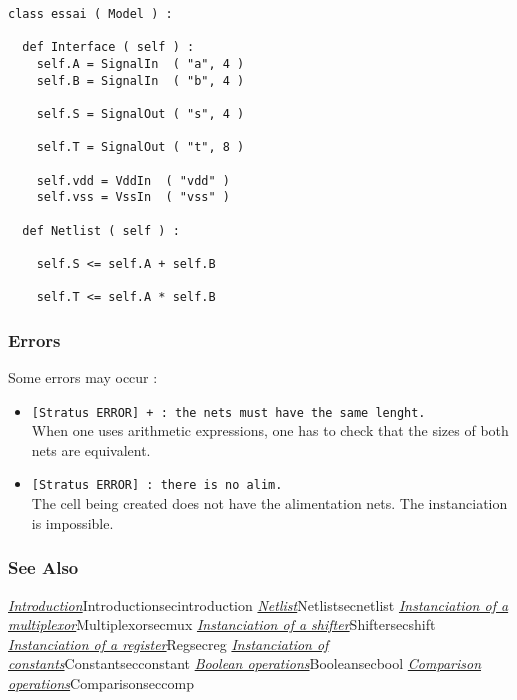 \begin{verbatim}
class essai ( Model ) :

  def Interface ( self ) :
    self.A = SignalIn  ( "a", 4 )
    self.B = SignalIn  ( "b", 4 )
    
    self.S = SignalOut ( "s", 4 )
    
    self.T = SignalOut ( "t", 8 )

    self.vdd = VddIn  ( "vdd" )
    self.vss = VssIn  ( "vss" )
	
  def Netlist ( self ) :

    self.S <= self.A + self.B

    self.T <= self.A * self.B
\end{verbatim}
    
\subsubsection{Errors}
    
Some errors may occur :
\begin{itemize}
    \item \verb-[Stratus ERROR] + : the nets must have the same lenght.-\\When one uses arithmetic expressions, one has to check that the sizes of both nets are equivalent.
    \item \verb-[Stratus ERROR] : there is no alim.-\\The cell being created does not have the alimentation nets. The instanciation is impossible.
\end{itemize}

\begin{htmlonly}

\subsubsection{See Also}

\hyperref[ref]{\emph{Introduction}}{}{Introduction}{secintroduction}
\hyperref[ref]{\emph{Netlist}}{}{Netlist}{secnetlist}
\hyperref[ref]{\emph{Instanciation of a multiplexor}}{}{Multiplexor}{secmux}
\hyperref[ref]{\emph{Instanciation of a shifter}}{}{Shifter}{secshift}
\hyperref[ref]{\emph{Instanciation of a register}}{}{Reg}{secreg}
\hyperref[ref]{\emph{Instanciation of constants}}{}{Constant}{secconstant}
\hyperref[ref]{\emph{Boolean operations}}{}{Boolean}{secbool}
\hyperref[ref]{\emph{Comparison operations}}{}{Comparison}{seccomp}

\end{htmlonly}
